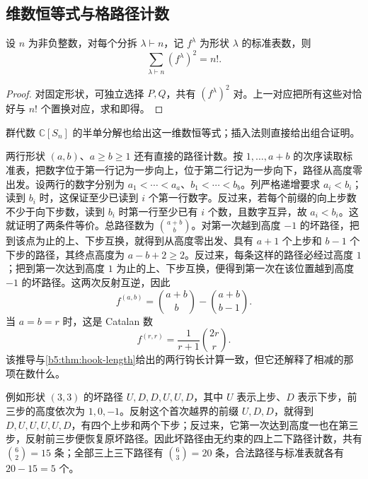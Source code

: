 \subsection{维数恒等式与格路径计数}
\label{b5:subsec:A02:03}

\begin{corollary}\label{b5:cor:tableau-squares}
	设 \(n\) 为非负整数，对每个分拆 \(\lambda\vdash n\)，记 \(f^\lambda\) 为形状 \(\lambda\) 的标准表数，则
	\[
		\sum_{\lambda\vdash n}(f^\lambda)^2=n!.
	\]
\end{corollary}
\begin{proof}
	对固定形状，可独立选择 \(P,Q\)，共有 \((f^\lambda)^2\) 对。上一对应把所有这些对恰好与 \(n!\) 个置换对应，求和即得。
\end{proof}

群代数 \(\mathbb C[S_n]\) 的半单分解也给出这一维数恒等式；插入法则直接给出组合证明。

\ProseParagraphBreak
两行形状 \((a,b)\)、\(a\ge b\ge1\) 还有直接的路径计数。按 \(1,\ldots,a+b\) 的次序读取标准表，把数字位于第一行记为一步向上，位于第二行记为一步向下，路径从高度零出发。设两行的数字分别为 \(a_1<\cdots<a_a\)、\(b_1<\cdots<b_b\)。列严格递增要求 \(a_i<b_i\)；读到 \(b_i\) 时，这保证至少已读到 \(i\) 个第一行数字。反过来，若每个前缀的向上步数不少于向下步数，读到 \(b_i\) 时第一行至少已有 \(i\) 个数，且数字互异，故 \(a_i<b_i\)。这就证明了两条件等价。总路径数为 \(\binom{a+b}{b}\)。对第一次越到高度 \(-1\) 的坏路径，把到该点为止的上、下步互换，就得到从高度零出发、具有 \(a+1\) 个上步和 \(b-1\) 个下步的路径，其终点高度为 \(a-b+2\ge2\)。反过来，每条这样的路径必经过高度 \(1\)；把到第一次达到高度 \(1\) 为止的上、下步互换，便得到第一次在该位置越到高度 \(-1\) 的坏路径。这两次反射互逆，因此
\[
	f^{(a,b)}=\binom{a+b}{b}-\binom{a+b}{b-1}.
\]
当 \(a=b=r\) 时，这是 Catalan 数
\[
	f^{(r,r)}=\frac1{r+1}\binom{2r}{r}.
\]
该推导与\cref{b5:thm:hook-length}给出的两行钩长计算一致，但它还解释了相减的那项在数什么。

\ProseParagraphBreak
例如形状 \((3,3)\) 的坏路径 \(U,D,D,U,U,D\)，其中 \(U\) 表示上步、\(D\) 表示下步，前三步的高度依次为 \(1,0,-1\)。反射这个首次越界的前缀 \(U,D,D\)，就得到 \(D,U,U,U,U,D\)，有四个上步和两个下步；反过来，它第一次达到高度一也在第三步，反射前三步便恢复原坏路径。因此坏路径由无约束的四上二下路径计数，共有 \(\binom62=15\) 条；全部三上三下路径有 \(\binom63=20\) 条，合法路径与标准表就各有 \(20-15=5\) 个。
